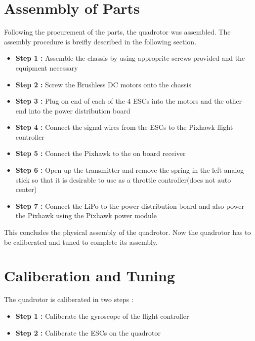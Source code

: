 \section{Assenmbly of Parts}
Following the procurement of the parts, the quadrotor was assembled. The assembly procedure is breifly described in the following section.
\begin{itemize}
  \item \textbf{Step 1 :} Assemble the chassis by using approprite screws provided and the equipment necessary
  \item \textbf{Step 2 :} Screw the Brushless DC motors onto the chassis
  \item \textbf{Step 3 :} Plug on end of each of the 4 ESCs into the motors and the other end into the power distribution board
  \item \textbf{Step 4 :} Connect the signal wires from the ESCs to the Pixhawk flight controller
  \item \textbf{Step 5 :} Connect the Pixhawk to the on board receiver
  \item \textbf{Step 6 :} Open up the transmitter and remove the spring in the left analog stick so that it is desirable to use as a throttle controller(does not auto center)
  \item \textbf{Step 7 :} Connect the LiPo to the power distribution board and also power the Pixhawk using the Pixhawk power module
\end{itemize}

This concludes the physical assembly of the quadrotor. Now the quadrotor has to be caliberated and tuned to complete its assembly.

\section{Caliberation and Tuning}
The quadrotor is caliberated in two steps :
\begin{itemize}
  \item \textbf{Step 1 :} Caliberate the gyroscope of the flight controller
  \item \textbf{Step 2 :} Caliberate the ESCs on the quadrotor
\end{itemize}

